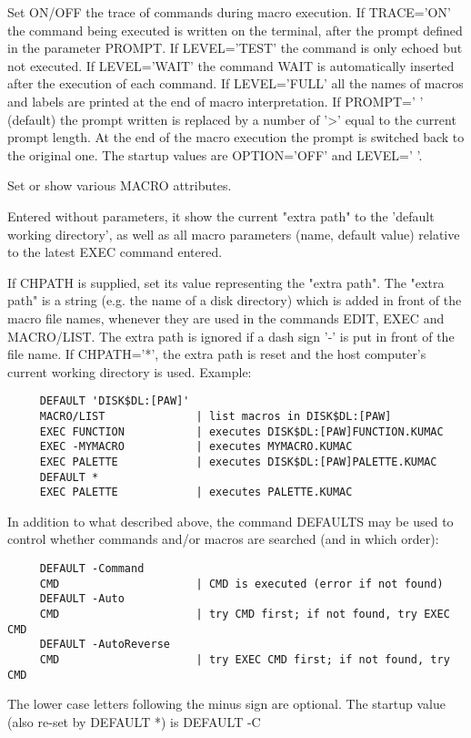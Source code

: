 \BEGARG
{}
\ENDARG
\BEGTEXT
Set ON/OFF the trace of commands during macro execution.
If TRACE='ON' the command being executed is written
on the terminal, after the prompt defined in the parameter PROMPT.
If LEVEL='TEST' the command is only echoed but not executed.
If LEVEL='WAIT' the command WAIT is automatically inserted
after the execution of each command.
If LEVEL='FULL' all the names of macros and labels are printed
at the end of macro interpretation.
If PROMPT=' ' (default) the prompt written is replaced by a number of '>'
equal to the current prompt length. At the end of the macro execution
the prompt is switched back to the original one.
The startup values are OPTION='OFF' and LEVEL=' '.
\ENDTEXT

\BEGARG
{}
\ENDARG
\BEGTEXT
Set or show various MACRO attributes.

Entered without parameters, it show the current "extra path"
to the 'default working directory',
as well as all macro parameters (name, default value)
relative to the latest EXEC command entered.

If CHPATH is supplied, set its value representing the "extra path".
The "extra path" is a string (e.g. the name of a disk directory) which
is added in front of the macro file names, whenever they are used in
the commands EDIT, EXEC and MACRO/LIST.
The extra path is ignored if a dash sign '-' is put in front of
the file name.
If CHPATH='*', the extra path is reset and the host computer's
current working directory is used.
Example:
\begin{verbatim}
     DEFAULT 'DISK$DL:[PAW]'
     MACRO/LIST              | list macros in DISK$DL:[PAW]
     EXEC FUNCTION           | executes DISK$DL:[PAW]FUNCTION.KUMAC
     EXEC -MYMACRO           | executes MYMACRO.KUMAC
     EXEC PALETTE            | executes DISK$DL:[PAW]PALETTE.KUMAC
     DEFAULT *
     EXEC PALETTE            | executes PALETTE.KUMAC
\end{verbatim}
In addition to what described above, the command DEFAULTS may be used to
control whether commands and/or macros are searched (and in which order):
\begin{verbatim}
     DEFAULT -Command
     CMD                     | CMD is executed (error if not found)
     DEFAULT -Auto
     CMD                     | try CMD first; if not found, try EXEC CMD
     DEFAULT -AutoReverse
     CMD                     | try EXEC CMD first; if not found, try CMD
\end{verbatim}
The lower case letters following the minus sign are optional.
The startup value (also re-set by DEFAULT *) is DEFAULT -C

